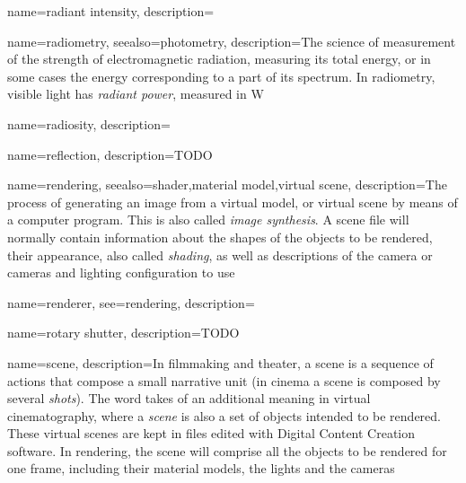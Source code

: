 {
	name={radiant intensity},
	description=\nopostdesc
}

{
	name={radiometry},
	seealso={photometry},
	description={The science of measurement of the strength of electromagnetic radiation,
		measuring its total energy, or in some cases the energy corresponding to a part of
		its spectrum. In radiometry, visible light has \textsl{radiant power},
		measured in \unit{\watt}}
}

{
	name={radiosity},
	description=\nopostdesc
}

{
	name={reflection},
	description={TODO}
}

{
	name={rendering},
	seealso={shader,material model,virtual scene},
	description={The process of generating an image from a virtual model, or virtual scene by 
		means of a computer program. This is also called \textsl{image synthesis}. A scene file
		will normally contain information about the shapes of the objects to be rendered, their
		appearance, also called \textsl{shading}, as well as descriptions of the camera or cameras and lighting configuration
		to use}
}

{
	name={renderer},
	see={rendering},
	description=\nopostdesc
}

{
	name={rotary shutter},
	description={TODO}
}

{
    name={scene},
	description={In filmmaking and theater, a scene is a sequence of actions that compose
		a small narrative unit (in cinema a scene is composed by several 
		\textsl{shots}). 
		The word takes of an additional meaning in virtual cinematography, 
		where a \textsl{scene} is also a set of objects intended to be rendered.
		These virtual scenes are kept in files edited with 
		Digital Content Creation software.
		In rendering, the scene will comprise all the objects to be rendered for one frame,
		including their material models, the lights and the cameras}
}


